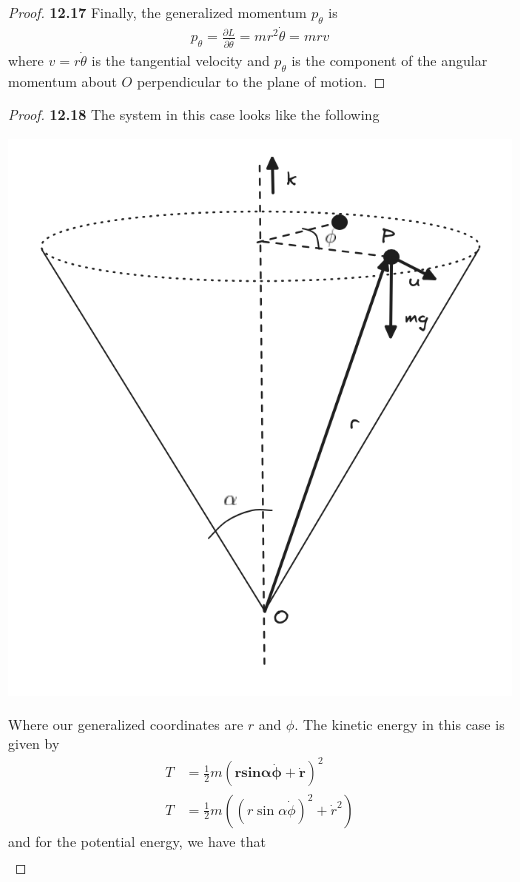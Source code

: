 \documentclass[11pt]{article}
\theoremstyle{definition}
\begin{document}
\begin{proof}{\textbf{12.17}}
    Finally, the generalized momentum $p_\theta$ is
    \begin{align*}
        p_\theta = \frac{\partial L}{\partial \dot\theta} = mr^2\dot\theta = mrv
    \end{align*}
    where $v = r\dot\theta$ is the tangential velocity and $p_\theta$ is
    the component of the angular momentum about $O$ perpendicular to the plane
    of motion.
\end{proof}
\cleardoublepage
\begin{proof}{\textbf{12.18}}
    The system in this case looks like the following
    \begin{center}
        \includegraphics[scale=0.4]{ch12-18.png}
    \end{center}
    Where our generalized coordinates are $r$ and $\phi$.
    The kinetic energy in this case is given by
    \begin{align*}
        T &= \frac{1}{2}m(\bm{r}\textbf{sin}\bm{\alpha\dot{\phi}}
        + \bm{\dot{r}})^2\\
        T &= \frac{1}{2}m((r\sin\alpha\dot{\phi})^2 + \dot{r}^2)
    \end{align*}
    and for the potential energy, we have that 
    \begin{align*}

\end{align*}
\end{proof}
\end{document}
